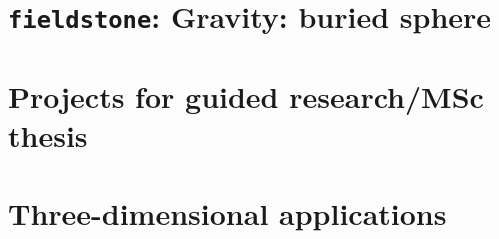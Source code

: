 \documentclass[a4paper]{article}
\begin{document}
\newpage
\section{{\tt fieldstone}: Gravity: buried sphere}



\newpage
\section{Projects for guided research/MSc thesis} %




\appendix

\newpage
\section{Three-dimensional applications}  %




%

\newpage %

\printindex %

\newpage %
\listoftodos[Notes] %
\end{document}
